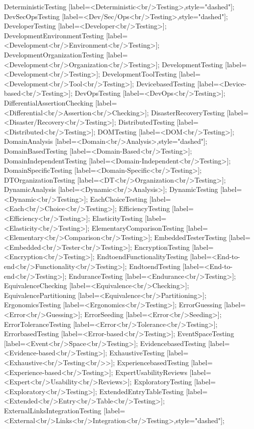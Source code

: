 \documentclass{article}
\begin{document}
{DeterministicTesting [label=<Deterministic<br/>Testing>,style="dashed"];
DevSecOpsTesting [label=<Dev/Sec/Ops<br/>Testing>,style="dashed"];
DeveloperTesting [label=<Developer<br/>Testing>];
DevelopmentEnvironmentTesting [label=<Development<br/>Environment<br/>Testing>];
DevelopmentOrganizationTesting [label=<Development<br/>Organization<br/>Testing>];
DevelopmentTesting [label=<Development<br/>Testing>];
DevelopmentToolTesting [label=<Development<br/>Tool<br/>Testing>];
DevicebasedTesting [label=<Device-based<br/>Testing>];
DevOpsTesting [label=<DevOps<br/>Testing>];
DifferentialAssertionChecking [label=<Differential<br/>Assertion<br/>Checking>];
DisasterRecoveryTesting [label=<Disaster/Recovery<br/>Testing>];
DistributedTesting [label=<Distributed<br/>Testing>];
DOMTesting [label=<DOM<br/>Testing>];
DomainAnalysis [label=<Domain<br/>Analysis>,style="dashed"];
DomainBasedTesting [label=<Domain-Based<br/>Testing>];
DomainIndependentTesting [label=<Domain-Independent<br/>Testing>];
DomainSpecificTesting [label=<Domain-Specific<br/>Testing>];
DTOrganizationTesting [label=<DT<br/>Organization<br/>Testing>];
DynamicAnalysis [label=<Dynamic<br/>Analysis>];
DynamicTesting [label=<Dynamic<br/>Testing>];
EachChoiceTesting [label=<Each<br/>Choice<br/>Testing>];
EfficiencyTesting [label=<Efficiency<br/>Testing>];
ElasticityTesting [label=<Elasticity<br/>Testing>];
ElementaryComparisonTesting [label=<Elementary<br/>Comparison<br/>Testing>];
EmbeddedTesterTesting [label=<Embedded<br/>Tester<br/>Testing>];
EncryptionTesting [label=<Encryption<br/>Testing>];
EndtoendFunctionalityTesting [label=<End-to-end<br/>Functionality<br/>Testing>];
EndtoendTesting [label=<End-to-end<br/>Testing>];
EnduranceTesting [label=<Endurance<br/>Testing>];
EquivalenceChecking [label=<Equivalence<br/>Checking>];
EquivalencePartitioning [label=<Equivalence<br/>Partitioning>];
ErgonomicsTesting [label=<Ergonomics<br/>Testing>];
ErrorGuessing [label=<Error<br/>Guessing>];
ErrorSeeding [label=<Error<br/>Seeding>];
ErrorToleranceTesting [label=<Error<br/>Tolerance<br/>Testing>];
ErrorbasedTesting [label=<Error-based<br/>Testing>];
EventSpaceTesting [label=<Event<br/>Space<br/>Testing>];
EvidencebasedTesting [label=<Evidence-based<br/>Testing>];
ExhaustiveTesting [label=<Exhaustive<br/>Testing<br/>>];
ExperiencebasedTesting [label=<Experience-based<br/>Testing>];
ExpertUsabilityReviews [label=<Expert<br/>Usability<br/>Reviews>];
ExploratoryTesting [label=<Exploratory<br/>Testing>];
ExtendedEntryTableTesting [label=<Extended<br/>Entry<br/>Table<br/>Testing>];
ExternalLinksIntegrationTesting [label=<External<br/>Links<br/>Integration<br/>Testing>,style="dashed"];
}
\end{document}
